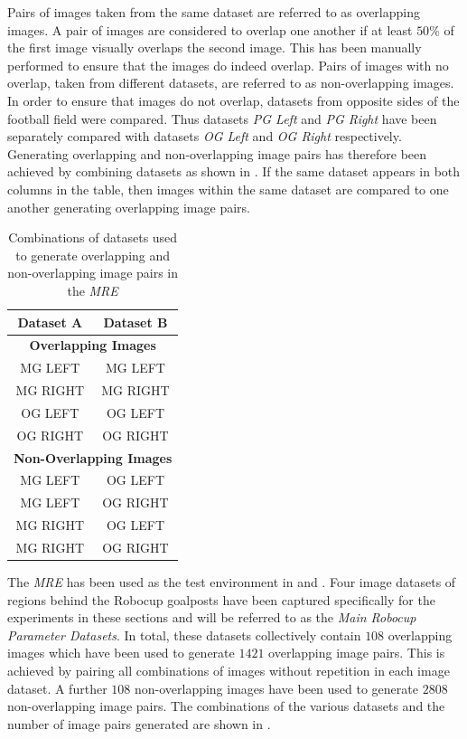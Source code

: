 \documentclass[11pt]{report}
\begin{document}
Pairs of images taken from the same dataset are referred to as overlapping images. A pair of images are considered to overlap one another if at least $50\%$ of the first image visually overlaps the second image. This has been manually performed to ensure that the images do indeed overlap. Pairs of images with no overlap, taken from different datasets, are referred to as non-overlapping images. In order to ensure that images do not overlap, datasets from opposite sides of the football field were compared. Thus datasets \textit{PG Left} and \textit{PG Right} have been separately compared with datasets \textit{OG Left} and \textit{OG Right} respectively. Generating overlapping and non-overlapping image pairs has therefore been achieved by combining datasets as shown in . If the same dataset appears in both columns in the table, then images within the same dataset are compared to one another generating overlapping image pairs. \\

\begin{table}
\centering
\caption{Combinations of datasets used to generate overlapping and non-overlapping image pairs in the \textit{MRE}}
\begin{tabular}{|c|c|}
\hline 
\textbf{Dataset A} & \textbf{Dataset B}\tabularnewline
\hline 
\hline 
\multicolumn{2}{|c|}{\textbf{Overlapping Images}}\tabularnewline
\hline 
MG LEFT & MG LEFT\tabularnewline
\hline 
MG RIGHT & MG RIGHT\tabularnewline
\hline 
OG LEFT & OG LEFT\tabularnewline
\hline 
OG RIGHT & OG RIGHT\tabularnewline
\hline 
\multicolumn{2}{|c|}{\textbf{Non-Overlapping Images}}\tabularnewline
\hline 
MG LEFT & OG LEFT\tabularnewline
\hline 
MG LEFT & OG RIGHT\tabularnewline
\hline 
MG RIGHT & OG LEFT\tabularnewline
\hline 
MG RIGHT & OG RIGHT\tabularnewline
\hline 
\end{tabular}
\label{table:overlap}
\end{table}

The \textit{MRE} has been used as the test environment in  and . Four image datasets of regions behind the Robocup goalposts have been captured specifically for the experiments in these sections and will be referred to as the \textit{Main Robocup Parameter Datasets}. In total, these datasets collectively contain $108$ overlapping images which have been used to generate $1421$ overlapping image pairs. This is achieved by pairing all combinations of images without repetition in each image dataset. A further $108$ non-overlapping images have been used to generate $2808$ non-overlapping image pairs. The combinations of the various datasets and the number of image pairs generated are shown in . \\
\end{document}
